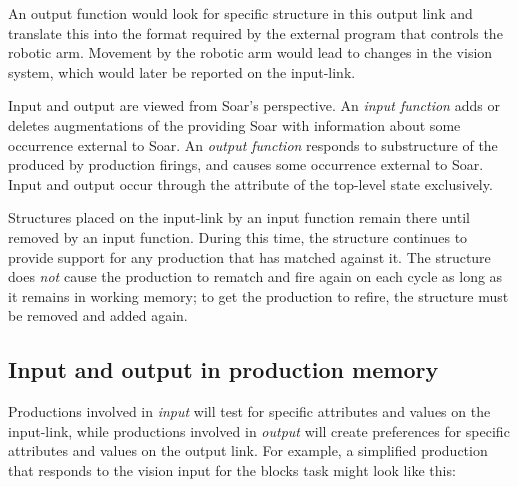 An output function would look for specific structure in this output link and translate this into the format required by the external program that controls the robotic arm. Movement by the robotic arm would lead to changes in the vision system, which would later be reported on the input-link.

Input and output are viewed from Soar's perspective. An \emph{input function} adds or deletes augmentations of the  providing Soar with information about some occurrence external to Soar. An \emph{output function} responds to substructure of the  produced by production firings, and causes some occurrence external to Soar. Input and output occur through the  attribute of the top-level state exclusively.

Structures placed on the input-link by an input function remain there until removed by an input function. During this time, the structure continues to provide support for any production that has matched against it. The structure does \emph{not} cause the production to rematch and fire again on each cycle as long as it remains in working memory; to get the production to refire, the structure must be removed and added again.



\subsection{Input and output in production memory}
\label{SYNTAX-io-pm}

Productions involved in \emph{input} will test for specific attributes and values on the input-link, while productions involved in \emph{output} will create preferences for specific attributes and values on the output link. For example, a simplified production that responds to the vision input for the blocks task might look like this:

